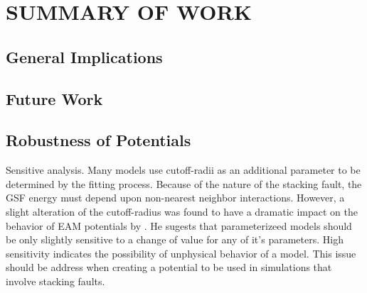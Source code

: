\chapter{SUMMARY OF WORK}

\section{General Implications}

\section{Future Work}

\section{Robustness of Potentials}
Sensitive analysis.  Many models use cutoff-radii as an additional parameter to be determined by the fitting process.  Because of the nature of the stacking fault, the GSF energy must depend upon non-nearest neighbor interactions.  However, a slight alteration of the cutoff-radius was found to have a dramatic impact on the behavior of EAM potentials by \cite{Zimmerman2000_Ni_gsf}.  He sugests that parameterizeed models should be only slightly sensitive to a change of value for any of it's parameters.  High sensitivity indicates the possibility of unphysical behavior of a model.  This issue should be address when creating a potential to be used in simulations that involve stacking faults.
